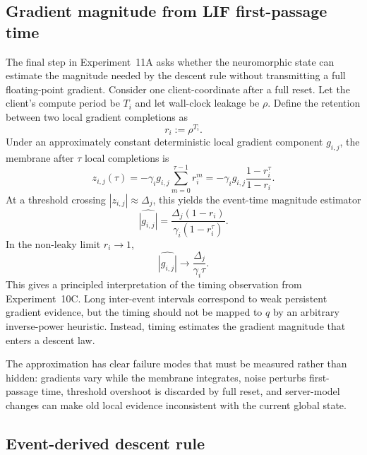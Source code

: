 \subsection{Gradient magnitude from LIF first-passage time}

The final step in Experiment~11A asks whether the neuromorphic state can estimate the magnitude needed by the descent rule without transmitting a full floating-point gradient. Consider one client-coordinate after a full reset. Let the client's compute period be $T_i$ and let wall-clock leakage be $\rho$. Define the retention between two local gradient completions as
\begin{equation}
  r_i:=\rho^{T_i}.
\end{equation}
Under an approximately constant deterministic local gradient component $g_{i,j}$, the membrane after $\tau$ local completions is
\begin{equation}
  z_{i,j}(\tau)
  =
  -\gamma_i g_{i,j}
  \sum_{m=0}^{\tau-1}r_i^m
  =
  -\gamma_i g_{i,j}
  \frac{1-r_i^\tau}{1-r_i}.
  \label{eq:11a-first-passage-state}
\end{equation}
At a threshold crossing $|z_{i,j}|\approx\Delta_j$, this yields the event-time magnitude estimator
\begin{equation}
  \widehat{|g_{i,j}|}
  =
  \frac{\Delta_j(1-r_i)}{\gamma_i(1-r_i^\tau)}.
  \label{eq:11a-timing-gradient-estimator}
\end{equation}
In the non-leaky limit $r_i\rightarrow1$,
\begin{equation}
  \widehat{|g_{i,j}|}
  \rightarrow
  \frac{\Delta_j}{\gamma_i\tau}.
\end{equation}
This gives a principled interpretation of the timing observation from Experiment~10C. Long inter-event intervals correspond to weak persistent gradient evidence, but the timing should not be mapped to $q$ by an arbitrary inverse-power heuristic. Instead, timing estimates the gradient magnitude that enters a descent law.

The approximation has clear failure modes that must be measured rather than hidden: gradients vary while the membrane integrates, noise perturbs first-passage time, threshold overshoot is discarded by full reset, and server-model changes can make old local evidence inconsistent with the current global state.

\subsection{Event-derived descent rule}

